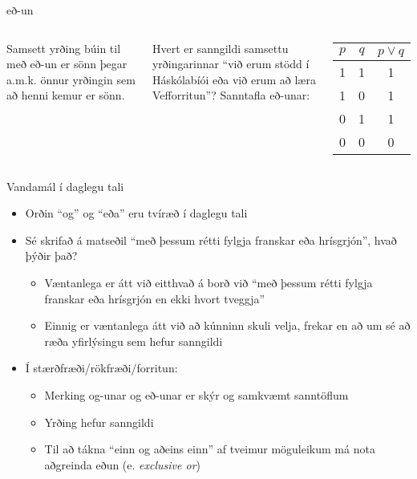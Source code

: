 \documentclass[handout]{beamer}
\begin{document}
\begin{frame}{eð-un}
\begin{columns}
Samsett yrðing búin til með eð-un er sönn þegar a.m.k. önnur yrðingin sem að henni kemur er sönn.

\vspace*{0.5cm}
Hvert er sanngildi samsettu yrðingarinnar ``við erum stödd í Háskólabíói eða við erum að læra Vefforritun''? \pause
{}
Sanntafla eð-unar:
\begin{center}
\begin{tabular}{ccc}
\toprule
$p$&$q$&$p \lor q$ \\
\midrule
1&1&1\\
1&0&1\\
0&1&1\\
0&0&0\\
\bottomrule
\end{tabular}
\end{center}
\end{columns}
\end{frame}

\begin{frame}{Vandamál í daglegu tali}
\begin{itemize}
 \item Orðin ``og'' og ``eða'' eru tvíræð í daglegu tali
 \item Sé skrifað á matseðil ``með þessum rétti fylgja franskar eða hrísgrjón'', hvað þýðir það?\pause
 \begin{itemize}
  \item Væntanlega er átt við eitthvað á borð við ``með þessum rétti fylgja franskar eða hrísgrjón en ekki hvort tveggja''
  \item Einnig er væntanlega átt við að kúnninn skuli velja, frekar en að um sé að ræða yfirlýsingu sem hefur sanngildi \pause
 \end{itemize}
 \item Í stærðfræði/rökfræði/forritun: 
 \begin{itemize}
  \item Merking og-unar og eð-unar er skýr og samkvæmt sanntöflum
  \item Yrðing hefur sanngildi
  \item Til að tákna ``einn og aðeins einn'' af tveimur möguleikum má nota aðgreinda eðun (e. \emph{exclusive or})
 \end{itemize}
\end{itemize}
\end{frame}
\end{document}

